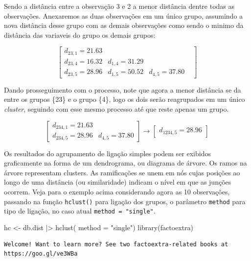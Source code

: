 \documentclass[
  letterpaper,
  DIV=11,
  numbers=noendperiod]{scrreprt}
\newenvironment{Shaded}{\begin{snugshade}}{\end{snugshade}}
\newcommand{\AttributeTok}[1]{\textcolor[rgb]{0.40,0.45,0.13}{#1}}
\newcommand{\FunctionTok}[1]{\textcolor[rgb]{0.28,0.35,0.67}{#1}}
\newcommand{\NormalTok}[1]{\textcolor[rgb]{0.00,0.23,0.31}{#1}}
\newcommand{\OtherTok}[1]{\textcolor[rgb]{0.00,0.23,0.31}{#1}}
\newcommand{\SpecialCharTok}[1]{\textcolor[rgb]{0.37,0.37,0.37}{#1}}
\newcommand{\StringTok}[1]{\textcolor[rgb]{0.13,0.47,0.30}{#1}}
\begin{document}
Sendo a distância entre a observação 3 e 2 a menor distância dentre
todas as observações. Anexaremos as duas observações em um único grupo,
assumindo a nova distância desse grupo com as demais observações como
sendo o minimo da distância das variaveis do grupo os demais grupos:

\[
\begin{bmatrix}
d_{23,1}=21.63 &  & & \\
d_{23,4}= 16.32 & d_{1,4}=31.29 & & \\
d_{23,5}=28.96 & d_{1,5}=50.52 & d_{4,5}=37.80 
\end{bmatrix}
\]

Dando prosseguimento com o processo, note que agora a menor distância se
da entre os grupos \{23\} e o grupo \{4\}, logo os dois serão
reagrupados em um único \emph{cluster}, seguindo com esse mesmo processo
até que reste apenas um grupo.

\[
\begin{bmatrix}
d_{234,1}=21.63 \\
d_{234,5}= 28.96 & d_{4,5} = 37.80
\end{bmatrix} \rightarrow
\begin{bmatrix}
d_{1234,5}=28.96
\end{bmatrix}
\]

Os resultados do agrupamento de ligação simples podem ser exibidos
graficamente na forma de um dendrograma, ou diagrama de árvore. Os ramos
na árvore representam clusters. As ramificações se unem em nós cujas
posições ao longo de uma distância (ou similaridade) indicam o nível em
que as junções ocorrem. Veja para o exemplo acima considerando agora as
10 observações, passando na função \texttt{hclust()} para ligação dos
grupos, o parâmetro \texttt{method} para tipo de ligação, no caso atual
\texttt{method\ =\ "single"}.

\begin{Shaded}
\begin{Highlighting}[]
\NormalTok{hc }\OtherTok{\textless{}{-}}\NormalTok{  db.dist }\SpecialCharTok{|\textgreater{}} 
  \FunctionTok{hclust}\NormalTok{( }\AttributeTok{method =} \StringTok{"single"}\NormalTok{) }
\FunctionTok{library}\NormalTok{(factoextra)}
\end{Highlighting}
\end{Shaded}

\begin{verbatim}
Welcome! Want to learn more? See two factoextra-related books at https://goo.gl/ve3WBa
\end{verbatim}
\end{document}
